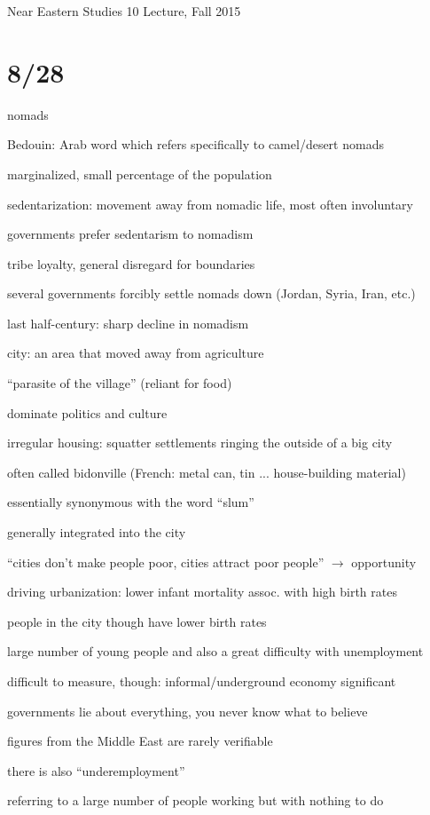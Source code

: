 \documentclass[12pt]{article}
\begin{document}
\noindent
Near Eastern Studies 10 Lecture, Fall 2015

\section{8/28}

\noindent
nomads

Bedouin: Arab word which refers specifically to camel/desert nomads

marginalized, small percentage of the population

\noindent
sedentarization: movement away from nomadic life, most often involuntary

governments prefer sedentarism to nomadism

tribe loyalty, general disregard for boundaries

several governments forcibly settle nomads down (Jordan, Syria, Iran, etc.)

last half-century: sharp decline in nomadism

\noindent
city: an area that moved away from agriculture

``parasite of the village'' (reliant for food)

dominate politics and culture

\noindent
irregular housing: squatter settlements ringing the outside of a big city

often called bidonville (French: metal can, tin ... house-building material)

essentially synonymous with the word ``slum''

generally integrated into the city

``cities don't make people poor, cities attract poor people'' $\to$ opportunity

driving urbanization: lower infant mortality assoc. with high birth rates

people in the city though have lower birth rates

\noindent
large number of young people and also a great difficulty with unemployment

difficult to measure, though: informal/underground economy significant

governments lie about everything, you never know what to believe

figures from the Middle East are rarely verifiable

\noindent
there is also ``underemployment''

referring to a large number of people working but with nothing to do
\end{document}
